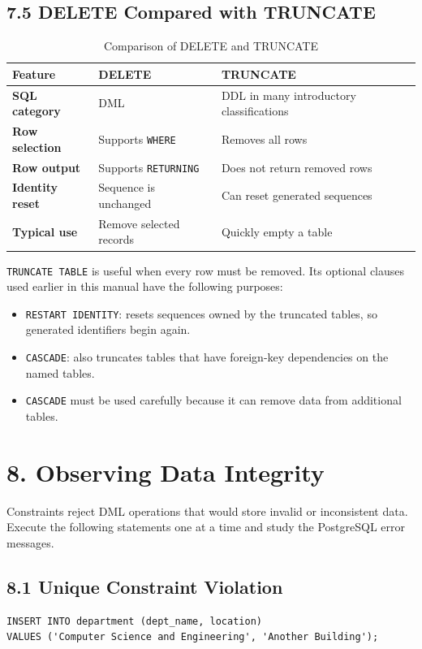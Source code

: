 \documentclass[12pt,a4paper]{article}
\begin{document}
\subsection*{7.5 DELETE Compared with TRUNCATE}
\begin{table}[H]
\centering
\renewcommand{\arraystretch}{1.4}
\begin{tabular}{>{\bfseries}p{3cm} p{4.5cm} p{4.5cm}}
\toprule
Feature & DELETE & TRUNCATE \\
\midrule
SQL category & DML & DDL in many introductory classifications \\
Row selection & Supports \texttt{WHERE} & Removes all rows \\
Row output & Supports \texttt{RETURNING} & Does not return removed rows \\
Identity reset & Sequence is unchanged & Can reset generated sequences \\
Typical use & Remove selected records & Quickly empty a table \\
\bottomrule
\end{tabular}
\caption{Comparison of DELETE and TRUNCATE}
\label{tab:delete_truncate}
\end{table}

\noindent\texttt{TRUNCATE TABLE} is useful when every row must be removed. Its optional clauses used
earlier in this manual have the following purposes:
\begin{itemize}
    \item \texttt{RESTART IDENTITY}: resets sequences owned by the truncated tables, so generated identifiers begin again.
    \item \texttt{CASCADE}: also truncates tables that have foreign-key dependencies on the named tables.
    \item \texttt{CASCADE} must be used carefully because it can remove data from additional tables.
\end{itemize}

\section*{8. Observing Data Integrity}
Constraints reject DML operations that would store invalid or inconsistent data. Execute the
following statements one at a time and study the PostgreSQL error messages.

\subsection*{8.1 Unique Constraint Violation}
\begin{verbatim}
INSERT INTO department (dept_name, location)
VALUES ('Computer Science and Engineering', 'Another Building');
\end{verbatim}
\end{document}
